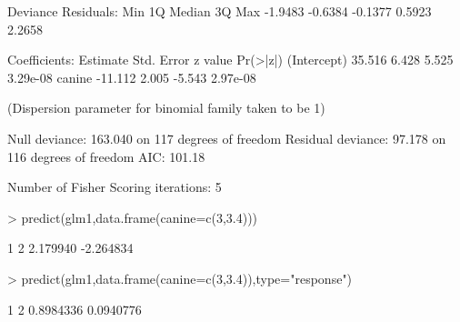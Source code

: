\documentclass[a4paper]{article}
\begin{document}
\begin{Schunk}
\begin{Soutput}
Deviance Residuals: 
    Min       1Q   Median       3Q      Max  
-1.9483  -0.6384  -0.1377   0.5923   2.2658  

Coefficients:
            Estimate Std. Error z value Pr(>|z|)
(Intercept)   35.516      6.428   5.525 3.29e-08
canine       -11.112      2.005  -5.543 2.97e-08

(Dispersion parameter for binomial family taken to be 1)

    Null deviance: 163.040  on 117  degrees of freedom
Residual deviance:  97.178  on 116  degrees of freedom
AIC: 101.18

Number of Fisher Scoring iterations: 5
\end{Soutput}
\begin{Sinput}
> predict(glm1,data.frame(canine=c(3,3.4)))
\end{Sinput}
\begin{Soutput}
        1         2 
 2.179940 -2.264834 
\end{Soutput}
\begin{Sinput}
> predict(glm1,data.frame(canine=c(3,3.4)),type="response")
\end{Sinput}
\begin{Soutput}
        1         2 
0.8984336 0.0940776 
\end{Soutput}
\end{Schunk}
\end{document}
